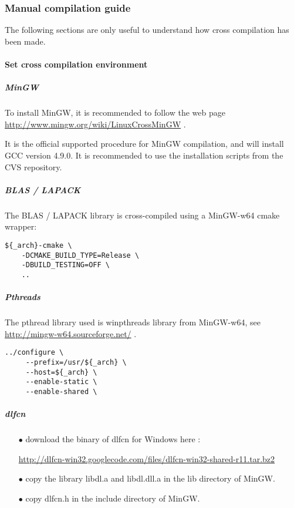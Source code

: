 \subsubsection{Manual compilation guide}

The following sections are only useful to understand how cross compilation has been made.

\paragraph{Set cross compilation environment}

\subparagraph{MinGW \label{mingw-installation}}
To install MinGW, it is recommended to follow the web page \url {http://www.mingw.org/wiki/LinuxCrossMinGW} .

It is the official supported procedure for MinGW compilation, and will install GCC version 4.9.0.
It is recommended to use the installation scripts from the CVS repository.

\subparagraph{BLAS / LAPACK}

The BLAS / LAPACK library is cross-compiled using a MinGW-w64 cmake wrapper:

\begin{verbatim}
${_arch}-cmake \
    -DCMAKE_BUILD_TYPE=Release \
    -DBUILD_TESTING=OFF \
    ..
\end{verbatim}

\subparagraph{Pthreads\label{pthread-installation}}

The pthread library used is winpthreads library from MinGW-w64, see \url {http://mingw-w64.sourceforge.net/} .

\begin{verbatim}
../configure \
     --prefix=/usr/${_arch} \
     --host=${_arch} \
     --enable-static \
     --enable-shared \
\end{verbatim}


\subparagraph{dlfcn}

\begin{itemize}
\item[$\bullet$]  download the binary of dlfcn for Windows here :

\url{http://dlfcn-win32.googlecode.com/files/dlfcn-win32-shared-r11.tar.bz2}

\item[$\bullet$]  copy the library libdl.a and libdl.dll.a in the lib directory of MinGW.
\item[$\bullet$]  copy dlfcn.h in the include directory of MinGW.
\end{itemize}

